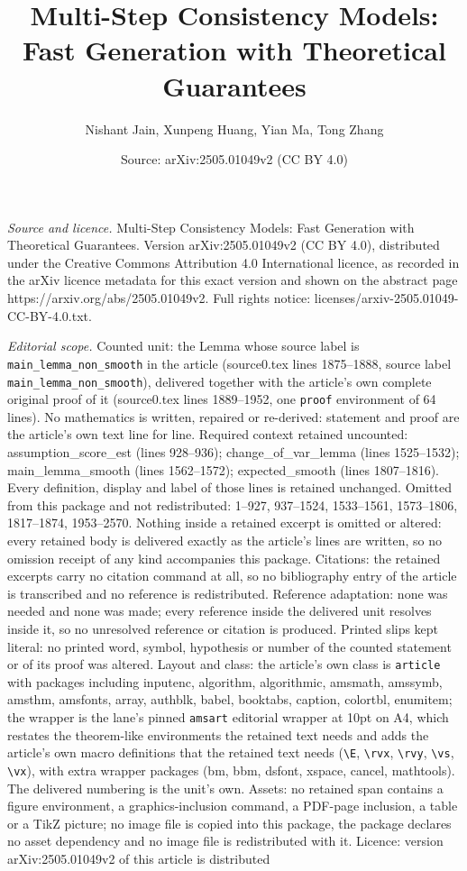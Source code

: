 \documentclass[10pt,a4paper]{amsart}
\title[Multi-Step Consistency Models: Fast Generation with Theoreti]{Multi-Step Consistency Models: Fast Generation with Theoretical Guarantees}
\author{Nishant Jain, Xunpeng Huang, Yian Ma, Tong Zhang}
\date{Source: arXiv:2505.01049v2 (CC BY 4.0)}
\begin{document}
\maketitle

\noindent\emph{Source and licence.} Multi-Step Consistency Models: Fast Generation with Theoretical Guarantees. Version arXiv:2505.01049v2 (CC BY 4.0), distributed under the Creative Commons Attribution 4.0 International licence, as recorded in the arXiv licence metadata for this exact version and shown on the abstract page https://arxiv.org/abs/2505.01049v2. Full rights notice: licenses/arxiv-2505.01049-CC-BY-4.0.txt.\par\smallskip

\noindent\textit{Editorial scope.} Counted unit: the Lemma whose source label is \texttt{main\_lemma\_non\_smooth} in the article (source0.tex lines 1875--1888, source label \texttt{main\_lemma\_non\_smooth}), delivered together with the article's own complete original proof of it (source0.tex lines 1889--1952, one \texttt{proof} environment of 64 lines). No mathematics is written, repaired or re-derived: statement and proof are the article's own text line for line. Required context retained uncounted: assumption\_score\_est (lines 928--936); change\_of\_var\_lemma (lines 1525--1532); main\_lemma\_smooth (lines 1562--1572); expected\_smooth (lines 1807--1816). Every definition, display and label of those lines is retained unchanged. Omitted from this package and not redistributed: 1--927, 937--1524, 1533--1561, 1573--1806, 1817--1874, 1953--2570. Nothing inside a retained excerpt is omitted or altered: every retained body is delivered exactly as the article's lines are written, so no omission receipt of any kind accompanies this package. Citations: the retained excerpts carry no citation command at all, so no bibliography entry of the article is transcribed and no reference is redistributed. Reference adaptation: none was needed and none was made; every reference inside the delivered unit resolves inside it, so no unresolved reference or citation is produced. Printed slips kept literal: no printed word, symbol, hypothesis or number of the counted statement or of its proof was altered. Layout and class: the article's own class is \texttt{article} with packages including inputenc, algorithm, algorithmic, amsmath, amssymb, amsthm, amsfonts, array, authblk, babel, booktabs, caption, colortbl, enumitem; the wrapper is the lane's pinned \texttt{amsart} editorial wrapper at 10pt on A4, which restates the theorem-like environments the retained text needs and adds the article's own macro definitions that the retained text needs (\texttt{\textbackslash E}, \texttt{\textbackslash rvx}, \texttt{\textbackslash rvy}, \texttt{\textbackslash vs}, \texttt{\textbackslash vx}), with extra wrapper packages (bm, bbm, dsfont, xspace, cancel, mathtools). The delivered numbering is the unit's own. Assets: no retained span contains a figure environment, a graphics-inclusion command, a PDF-page inclusion, a table or a TikZ picture; no image file is copied into this package, the package declares no asset dependency and no image file is redistributed with it. Licence: version arXiv:2505.01049v2 of this article is distributed 
\end{document}

